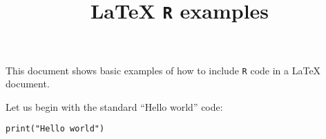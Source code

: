 \documentclass[a4paper,12pt]{article}
\begin{document}
\title{\textbf{\LaTeX{}  \texttt{R} examples}}
\date{}

\maketitle

This document shows basic examples of how to include \texttt{R} code in a \LaTeX{}    document.

Let us begin with the standard ``Hello world'' code:

\begin{lstlisting}
print("Hello world")
\end{lstlisting}
\end{document}
